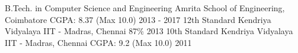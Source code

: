 \begin{cventries}
  \cventry
    {B.Tech. in Computer Science and Engineering}
    {Amrita School of Engineering, Coimbatore}
    {CGPA: 8.37 (Max 10.0)}
    {2013 - 2017}
    {\empty}
  \cventry
    {12th Standard}
    {Kendriya Vidyalaya IIT - Madras, Chennai}
    {87\%}
    {2013}
    {\empty}
  \cventry
    {10th Standard}
    {Kendriya Vidyalaya IIT - Madras, Chennai}
    {CGPA: 9.2 (Max 10.0)}
    {2011}
    {\empty}
\end{cventries}
